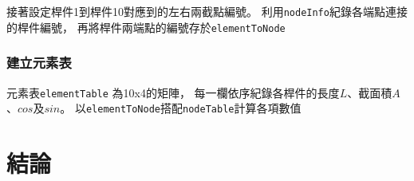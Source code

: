 \documentclass[12pt,a4paper]{article}
\begin{document}
            接著設定桿件1到桿件10對應到的左右兩截點編號。
            利用\texttt{nodeInfo}紀錄各端點連接的桿件編號，
            再將桿件兩端點的編號存於\texttt{elementToNode}
            
            

        \subsubsection{建立元素表}
            
            元素表\texttt{elementTable} 為10x4的矩陣，
            每一欄依序紀錄各桿件的長度$L$、截面積$A$、$cos$及$sin$。
            以\texttt{elementToNode}搭配\texttt{nodeTable}計算各項數值
            

\newpage

\section{結論}
\end{document}

